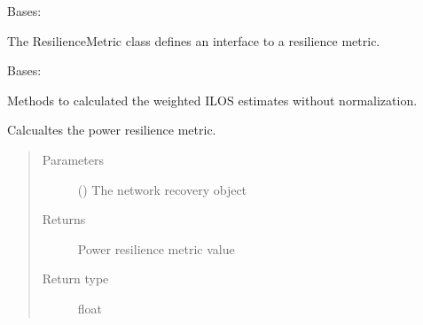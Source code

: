 \documentclass[letterpaper,10pt,english]{sphinxmanual}
\begin{document}
\begin{fulllineitems}
\label{\detokenize{apidoc:dreaminsg_integrated_model.src.resilience_metrics.ResilienceMetric}}
\sphinxAtStartPar
Bases: 

\sphinxAtStartPar
The ResilienceMetric class defines an interface to a resilience metric.

\end{fulllineitems}


\begin{fulllineitems}
\label{\detokenize{apidoc:dreaminsg_integrated_model.src.resilience_metrics.WeightedResilienceMetric}}
\sphinxAtStartPar
Bases: 

\sphinxAtStartPar
Methods to calculated the weighted ILOS estimates without normalization.

\begin{fulllineitems}
\label{\detokenize{apidoc:dreaminsg_integrated_model.src.resilience_metrics.WeightedResilienceMetric.calculate_power_resmetric}}
\sphinxAtStartPar
Calcualtes the power resilience metric.
\begin{quote}\begin{description}
\item[{Parameters}] \leavevmode
\sphinxAtStartPar
{} () \textendash{} The network recovery object

\item[{Returns}] \leavevmode
\sphinxAtStartPar
Power resilience metric value

\item[{Return type}] \leavevmode
\sphinxAtStartPar
float


\end{description}
\end{quote}
\end{fulllineitems}
\end{fulllineitems}
\end{document}
